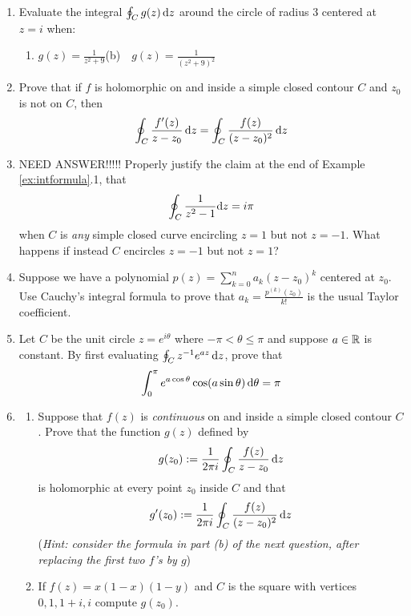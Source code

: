 \begin{exercises*}
\begin{enumerate}
  \item Evaluate the integral $\oint_C g(z)\,{\mathrm{d} z}$ around the circle of radius 3 centered at $z=i$ when:
  \begin{enumerate}
    \item $\displaystyle g(z)=\frac 1{z^2+9}$\qquad (b)\ \ $\displaystyle g(z)=\frac 1{(z^2+9)^2}$
  \end{enumerate} 
  
  \item Prove that if $f$ is holomorphic on and inside a simple closed contour $C$ and $z_0$ is not on $C$, then
  \[\oint_C\frac{f'(z)}{z-z_0}\,{\mathrm{d} z} =\oint_C\frac{f(z)}{(z-z_0)^2}\,{\mathrm{d} z}\]
  
  \item NEED ANSWER!!!!! Properly justify the claim at the end of Example \ref{ex:intformula}.1, that
  \[
  	\oint_{C}\frac{1}{z^2-1}{\mathrm{d} z}=i\pi
  \]
  when $C$ is \emph{any} simple closed curve encircling $z=1$ but not $z=-1$. What happens if instead $C$ encircles $z=-1$ but not $z=1$?
  
  \item Suppose we have a polynomial $p(z)=\sum\limits_{k=0}^na_k(z-z_0)^k$ centered at $z_0$.
  Use Cauchy's integral formula to prove that $a_k=\frac{p^{(k)}(z_0)}{k!}$ is the usual Taylor coefficient.
  
  \item Let $C$ be the unit circle $z=e^{i\theta}$ where $-\pi<\theta\le\pi$ and suppose $a\in\mathbb{R}$ is constant. By first evaluating $\oint_Cz^{-1}e^{az}\,{\mathrm{d} z}$, prove that
  \[\int_0^\pi e^{a\cos\theta}\cos(a\sin\theta)\,{\mathrm{d}\theta}=\pi\] 
	
	  
  \item\begin{enumerate}
     \item Suppose that $f(z)$ is \emph{continuous} on and inside a simple closed contour $C$. Prove that the function $g(z)$ defined by
    \[g(z_0):=\frac 1{2\pi i}\oint_C\frac{f(z)}{z-z_0}\,{\mathrm{d} z}\]
    is holomorphic at every point $z_0$ inside $C$ and that
    \[g'(z_0):=\frac 1{2\pi i}\oint_C\frac{f(z)}{(z-z_0)^2}\,{\mathrm{d} z}\]
    (\emph{Hint: consider the formula in part (b) of the next question, after replacing the first two $f$'s by $g$})
    
    \item If $f(z)=x(1-x)(1-y)$ and $C$ is the square with vertices $0,1,1+i,i$ compute $g(z_0)$.
  \end{enumerate}


\end{enumerate}
\end{exercises*}
